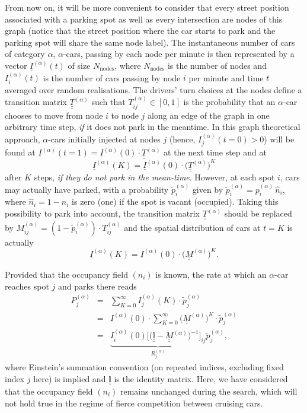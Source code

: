 \documentclass[trsc,reprint]{informs3}
\newcommand{\ul}[1]{\underline{#1}}
\newcommand{\uul}[1]{\underline{\underline{#1}}}
\newcommand{\alp}{^{(\alpha)}}
\newcommand{\Ma}{ {\uul{M}\alp}}
\newcommand{\AN}[1]{#1}
\begin{document}
From now on, it will be more convenient to consider that every street position associated with a parking spot as well as every intersection are nodes of this graph
(notice that the street position where the car starts to park and the parking spot will share the same node label). 
The instantaneous number of cars of category $\alpha$, $\alpha$-cars,
passing by each node \AN{per minute} is then represented by a vector $\ul{I}\alp(t)$ of size $N_{\mathrm{nodes}}$, where $N_{\mathrm{nodes}}$ is the number of nodes and $I_i\alp(t)$ is the number of cars \AN{passing by} node $i$ \AN{per minute} and time $t$ averaged over random realisations.
The drivers' turn choices at the nodes define a transition matrix $\uul{T}\alp$ such that $T_{ij}\alp\in[0,1]$ is the probability that an $\alpha$-car chooses to move from node $i$ to
node $j$ along an edge of the graph in one arbitrary time step, \emph{if} it does not park in the meantime. 
In this graph theoretical approach, $\alpha$-cars initially injected at nodes $j$ (hence, $I_j\alp(t=0)>0$) will be 
\AN{found at} $\ul{I}\alp(t=1)= \ul{I}\alp(0) \cdot \uul{T}\alp$ at the next time step and at 
\begin{equation}
   \ul{I}\alp(K)= \ul{I}\alp(0) \cdot \Big(\uul{T}\alp\Big)^K 
\end{equation}
after $K$ steps, \emph{if they do not park in the mean-time}.
However, at each spot $i$, cars may actually have parked, with a probability $\tilde{p}\alp_i$ given by  $\tilde{p}\alp_i=p_i\alp\,\hat{n}_i$, where $\hat{n}_i=1-n_i$ is zero (one) if the spot is vacant (occupied). Taking this possibility to park into account, the transition matrix $\uul{T}\alp$ should be replaced by $M\alp_{ij}= (1-\tilde{p}\alp_i)\cdot T_{ij}\alp$ and
the spatial distribution
of cars at $t=K$ is actually 
\begin{equation}
   \ul{I}\alp(K)= \ul{I}\alp(0) \cdot  \Big(\Ma\Big)^K.
    \label{eq:Ialp}
\end{equation}

Provided that the occupancy field $(n_i)$ is known, the rate at which an $\alpha$-car 
reaches spot $j$ and parks there reads
\begin{eqnarray}
    P\alp_{j} & = & \sum_{K=0}^{\infty}I\alp_{j}(K)\cdot \tilde{p}\alp_j \nonumber \\
          & = & \ul{I}\alp(0) \cdot \sum_{K=0}^{\infty}  \Big(\Ma\Big)^K \cdot \tilde{p}\alp_j \nonumber\\
           & = & \underbrace{I_i\alp(0) \Big[\Big(\uul{\mathbb{I}} - \Ma\Big)^{-1}\Big]_{ij}}_{R_j\alp} \tilde{p}\alp_j, 
           \label{eq:P_j_alp}
\end{eqnarray}
where Einstein's summation convention (on repeated indices, excluding fixed index $j$ here) is implied and $\uul{\mathbb{I}}$ is the identity matrix. Here, we have considered that the occupancy field $(n_i)$ remains unchanged during the search, which will not hold true in the regime of fierce competition between cruising cars.
\end{document}
